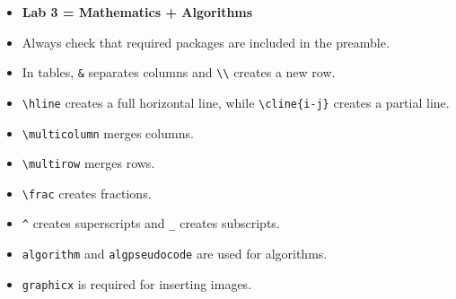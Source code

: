 \documentclass[a4paper,10pt]{article}
\begin{document}
\begin{itemize}
    \item \textbf{Lab 3 = Mathematics + Algorithms}
    \item Always check that required packages are included in the
    preamble.
    \item In tables, \texttt{\&} separates columns and
    \texttt{\textbackslash\textbackslash} creates a new row.
    \item \texttt{\textbackslash hline} creates a full horizontal line,
    while \texttt{\textbackslash cline\{i-j\}} creates a partial line.
    \item \texttt{\textbackslash multicolumn} merges columns.
    \item \texttt{\textbackslash multirow} merges rows.
    \item \texttt{\textbackslash frac} creates fractions.
    \item \texttt{\textasciicircum} creates superscripts and
    \texttt{\_} creates subscripts.
    \item \texttt{algorithm} and \texttt{algpseudocode} are used for
    algorithms.
    \item \texttt{graphicx} is required for inserting images.
\end{itemize}
\end{document}

